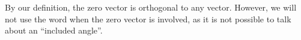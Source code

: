 \documentclass{ximera}
\begin{document}
\begin{remark}  By our definition, the zero vector is orthogonal to any vector.  However, we will not use the word  when the zero vector is involved, as it is not possible to talk about an ``included angle''.
\end{remark}
 
 
\end{document}
